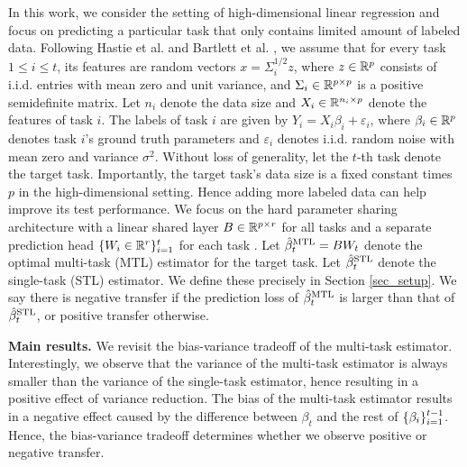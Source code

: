 In this work, we consider the setting of high-dimensional linear regression and focus on predicting a particular task that only contains limited amount of labeled data.
Following Hastie et al. \cite{HMRT19} and Bartlett et al. \cite{BLLT20}, we assume that for every task $1\le i\le t$, its features are random vectors $x = \Sigma_i^{1/2}z$, where $z\in\mathbb{R}^p$ consists of i.i.d. entries with mean zero and unit variance, and $\Sigma_i\in\mathbb{R}^{p\times p}$ is a positive semidefinite matrix.
Let $n_i$ denote the data size and $X_i\in\mathbb{R}^{n_i\times p}$ denote the features of task $i$.
The labels of task $i$ are given by $Y_i = X_i\beta_i + \varepsilon_i$, where $\beta_i\in\mathbb{R}^p$ denotes task $i$'s ground truth parameters and $\varepsilon_i$ denotes i.i.d. random noise with mean zero and variance $\sigma^2$.
Without loss of generality, let the $t$-th task denote the target task.
Importantly, the target task's data size is a fixed constant times $p$ in the high-dimensional setting.
Hence adding more labeled data can help improve its test performance.
We focus on the hard parameter sharing architecture with a linear shared layer $B\in\mathbb{R}^{p\times r}$ for all tasks and a separate prediction head $\{W_i \in \mathbb{R}^{r}\}_{i=1}^t$ for each task \cite{R17,MTDNN19,WZR20}.
Let $\hat{\beta}_t^{\text{MTL}} = B W_t$ denote the optimal multi-task (MTL) estimator for the target task.
Let $\hat{\beta}_t^{\text{STL}}$ denote the single-task (STL) estimator.
We define these precisely in Section \ref{sec_setup}.
We say there is negative transfer if the prediction loss of $\hat{\beta}_t^{\text{MTL}}$  is larger than that of $\hat{\beta}_t^{\text{STL}}$, or positive transfer otherwise.

\textbf{Main results.}
We revisit the bias-variance tradeoff of the multi-task estimator.
Interestingly, we observe that the variance of the multi-task estimator is always smaller than the variance of the single-task estimator, hence resulting in a positive effect of variance reduction.
The bias of the multi-task estimator results in a negative effect caused by the difference between $\beta_t$ and the rest of $\{\beta_i\}_{i=1}^{t-1}$.
Hence, the bias-variance tradeoff determines whether we observe positive or negative transfer.

